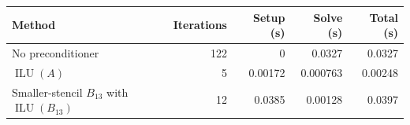 \begin{tabularx}{\textwidth}{Xrrrr}
\toprule
Method & Iterations & Setup (s) & Solve (s) & Total (s) \\
\midrule
No preconditioner & 122 & 0 & 0.0327 & 0.0327 \\
$\operatorname{ILU}(A)$ & 5 & 0.00172 & 0.000763 & 0.00248 \\
Smaller-stencil $B_{13}$ with $\operatorname{ILU}(B_{13})$ & 12 & 0.0385 & 0.00128 & 0.0397 \\
\bottomrule
\end{tabularx}
